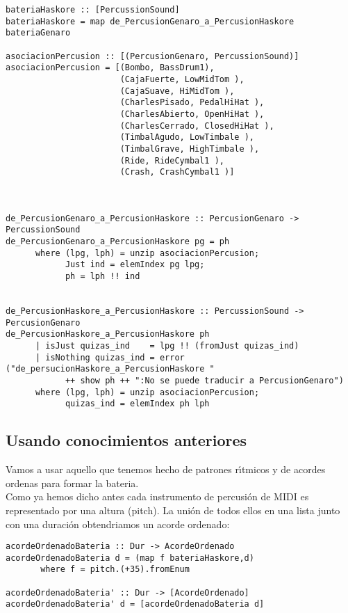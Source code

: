\documentclass[a4paper]{report}
\begin{document}
\small
\begin{verbatim}
bateriaHaskore :: [PercussionSound]
bateriaHaskore = map de_PercusionGenaro_a_PercusionHaskore bateriaGenaro

asociacionPercusion :: [(PercusionGenaro, PercussionSound)]
asociacionPercusion = [(Bombo, BassDrum1),
                       (CajaFuerte, LowMidTom ),
                       (CajaSuave, HiMidTom ),
                       (CharlesPisado, PedalHiHat ),
                       (CharlesAbierto, OpenHiHat ),
                       (CharlesCerrado, ClosedHiHat ),
                       (TimbalAgudo, LowTimbale ),
                       (TimbalGrave, HighTimbale ),
                       (Ride, RideCymbal1 ),
                       (Crash, CrashCymbal1 )]



de_PercusionGenaro_a_PercusionHaskore :: PercusionGenaro -> PercussionSound
de_PercusionGenaro_a_PercusionHaskore pg = ph
      where (lpg, lph) = unzip asociacionPercusion;
            Just ind = elemIndex pg lpg;
            ph = lph !! ind


de_PercusionHaskore_a_PercusionHaskore :: PercussionSound -> PercusionGenaro
de_PercusionHaskore_a_PercusionHaskore ph 
      | isJust quizas_ind    = lpg !! (fromJust quizas_ind)
      | isNothing quizas_ind = error ("de_persucionHaskore_a_PercusionHaskore " 
            ++ show ph ++ ":No se puede traducir a PercusionGenaro")
      where (lpg, lph) = unzip asociacionPercusion;
            quizas_ind = elemIndex ph lph
\end{verbatim}
\normalsize

\subsection{Usando conocimientos anteriores}
Vamos a usar aquello que tenemos hecho de patrones r\'\i tmicos y de acordes ordenas
para formar la bateria.\\
\indent Como ya hemos dicho antes cada instrumento de percusi\'on de MIDI es representado
por una altura (pitch). La uni\'on de todos ellos en una lista
junto con una duraci\'on obtendriamos un acorde ordenado:

\small
\begin{verbatim}
acordeOrdenadoBateria :: Dur -> AcordeOrdenado
acordeOrdenadoBateria d = (map f bateriaHaskore,d)
       where f = pitch.(+35).fromEnum

acordeOrdenadoBateria' :: Dur -> [AcordeOrdenado]
acordeOrdenadoBateria' d = [acordeOrdenadoBateria d]
\end{verbatim}
\normalsize
\end{document}
